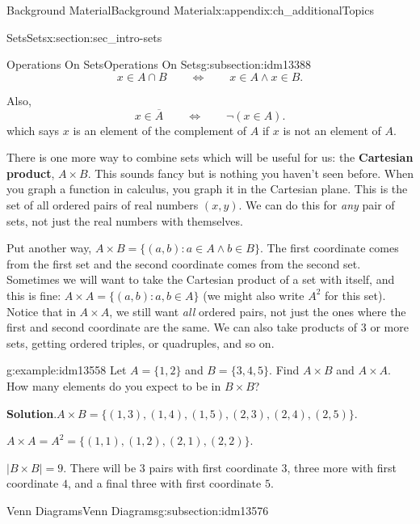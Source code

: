 \documentclass[oneside,10pt,]{book}
\newcommand{\terminology}[1]{\textbf{#1}}
\numberwithin{equation}{chapter}
\def\st{:}
\def\Iff{\Leftrightarrow}
\begin{document}
\begin{appendixptx}{Background Material}{}{Background Material}{}{}{x:appendix:ch_additionalTopics}
\begin{sectionptx}{Sets}{}{Sets}{}{}{x:section:sec_intro-sets}
\begin{subsectionptx}{Operations On Sets}{}{Operations On Sets}{}{}{g:subsection:idm13388}
\begin{equation*}
x \in A \cap B \qquad \Iff \qquad x \in A \wedge x \in B.
\end{equation*}
%
\par
Also,%
\begin{equation*}
x \in \overline A \qquad \Iff \qquad \neg (x \in A).
\end{equation*}
which says \(x\) is an element of the complement of \(A\) if \(x\) is not an element of \(A\).%
\par
There is one more way to combine sets which will be useful for us: the \terminology{Cartesian product}, \(A \times B\)\label{g:notation:idm13545}. This sounds fancy but is nothing you haven't seen before. When you graph a function in calculus, you graph it in the Cartesian plane. This is the set of all ordered pairs of real numbers \((x,y)\). We can do this for \emph{any} pair of sets, not just the real numbers with themselves.%
\par
Put another way, \(A \times B = \{(a,b) \st a \in A \wedge b \in B\}\). The first coordinate comes from the first set and the second coordinate comes from the second set. Sometimes we will want to take the Cartesian product of a set with itself, and this is fine: \(A \times A = \{(a,b) \st a, b \in A\}\) (we might also write \(A^2\) for this set). Notice that in \(A \times A\), we still want \emph{all} ordered pairs, not just the ones where the first and second coordinate are the same. We can also take products of 3 or more sets, getting ordered triples, or quadruples, and so on.%
\begin{example}{}{g:example:idm13558}%
Let \(A = \{1,2\}\) and \(B = \{3,4,5\}\). Find \(A \times B\) and \(A \times A\). How many elements do you expect to be in \(B \times B\)?%
\par\smallskip%
\noindent\textbf{Solution}.\hypertarget{g:solution:idm13566}{}\quad{}\(A \times B = \{(1,3), (1,4), (1,5), (2,3), (2,4), (2,5)\}\).%
\par
\(A \times A = A^2 = \{(1,1), (1,2), (2,1), (2,2)\}\).%
\par
\(|B\times B| = 9\). There will be 3 pairs with first coordinate \(3\), three more with first coordinate \(4\), and a final three with first coordinate \(5\).%
\end{example}
\end{subsectionptx}
%
%
\typeout{************************************************}
\typeout{************************************************}
%
\begin{subsectionptx}{Venn Diagrams}{}{Venn Diagrams}{}{}{g:subsection:idm13576}

\end{subsectionptx}
\end{sectionptx}
\end{appendixptx}
\end{document}
